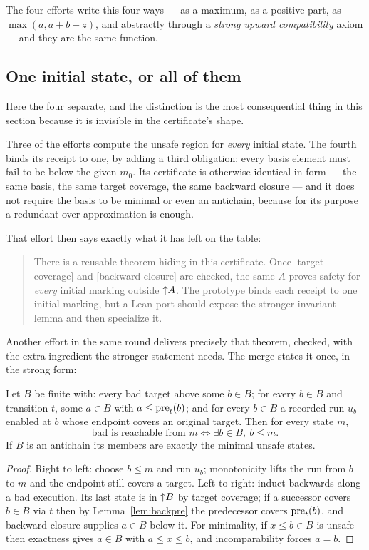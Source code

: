 The four efforts write this four ways --- as a maximum, as a positive part, as
$\max(a,a+b-z)$, and abstractly through a \emph{strong upward compatibility}
axiom --- and they are the same function.

\subsection{One initial state, or all of them}

Here the four separate, and the distinction is the most consequential thing in
this section because it is invisible in the certificate's shape.

Three of the efforts compute the unsafe region for \emph{every} initial state.
The fourth binds its receipt to one, by adding a third obligation: every basis
element must fail to be below the given $m_0$. Its certificate is otherwise
identical in form --- the same basis, the same target coverage, the same
backward closure --- and it does not require the basis to be minimal or even an
antichain, because for its purpose a redundant over-approximation is enough.

That effort then says exactly what it has left on the table:

\begin{quote}\small
There is a reusable theorem hiding in this certificate. Once
[target coverage] and [backward closure] are checked, the same $A$ proves
safety for \emph{every} initial marking outside ${\uparrow}A$. The prototype binds
each receipt to one initial marking, but a Lean port should expose the
stronger invariant lemma and then specialize it.
\end{quote}

Another effort in the same round delivers precisely that theorem, checked, with
the extra ingredient the stronger statement needs. The merge states it once, in
the strong form:

\begin{theorem}\label{thm:wsts-exact}
Let $B$ be finite with: every bad target above some $b\in B$; for every $b\in B$
and transition $t$, some $a\in B$ with $a\le\operatorname{pre}_t(b)$; and for every $b\in B$
a recorded run $u_b$ enabled at $b$ whose endpoint covers an original target.
Then for every state $m$,
\[
 \text{bad is reachable from } m \iff \exists b\in B,\ b\le m .
\]
If $B$ is an antichain its members are exactly the minimal unsafe states.
\end{theorem}
\begin{proof}
Right to left: choose $b\le m$ and run $u_b$; monotonicity lifts the run from
$b$ to $m$ and the endpoint still covers a target. Left to right: induct
backwards along a bad execution. Its last state is in ${\uparrow}B$ by target
coverage; if a successor covers $b\in B$ via $t$ then by
Lemma~\ref{lem:backpre} the predecessor covers $\operatorname{pre}_t(b)$, and backward
closure supplies $a\in B$ below it. For minimality, if $x\le b\in B$ is unsafe
then exactness gives $a\in B$ with $a\le x\le b$, and incomparability forces
$a=b$.
\end{proof}

